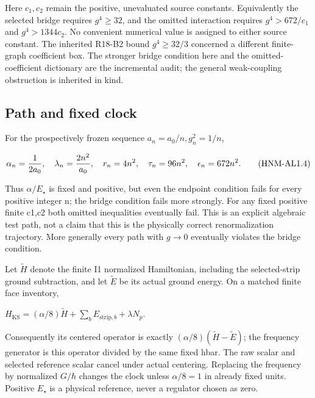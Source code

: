 Here \(c_1,c_2\) remain the positive, unevaluated source constants. Equivalently the selected bridge requires \(g^{4}\ge 32\), and the omitted interaction requires \(g^{4}>672/c_1\) and \(g^{4}>1344c_2\). No convenient numerical value is assigned to either source constant. The inherited R18-B2 bound \(g^{4}\ge 32/3\) concerned a different finite-graph coefficient box. The stronger bridge condition here and the omitted-coefficient dictionary are the incremental audit; the general weak-coupling obstruction is inherited in kind.

\hypertarget{r29-al1-path-and-fixed-clock}{%
\subsection{Path and fixed clock}\label{r29:al1:r29-al1-path-and-fixed-clock}}

For the prospectively frozen sequence \(a_n=a_0/n, g_n^{2}=1/n\),

\begin{equation}
\alpha_n={1\over2a_0},\quad\lambda_n={2n^2\over a_0},\quad
r_n=4n^2,\quad\tau_n=96n^2,\quad\epsilon_n=672n^2.
\tag{HNM-AL1.4}
\label{r29:al1:eq4}
\end{equation}

Thus \(\alpha/E_\star\) is fixed and positive, but even the endpoint condition fails for every positive integer n; the bridge condition fails more strongly. For any fixed positive finite c1,c2 both omitted inequalities eventually fail. This is an explicit algebraic test path, not a claim that this is the physically correct renormalization trajectory. More generally every path with \(g\to 0\) eventually violates the bridge condition.

Let \(\widetilde H\) denote the finite I1 normalized Hamiltonian, including the selected-strip ground subtraction, and let \(\widetilde E\) be its actual ground energy. On a matched finite face inventory,

\(H_{\mathrm{KS}} = (\alpha/8) \widetilde H + \sum_b E_{\mathrm{strip},b} + \lambda N_p\).

Consequently its centered operator is exactly \((\alpha/8)(\widetilde H-\widetilde E)\); the frequency generator is this operator divided by the same fixed hbar. The raw scalar and selected reference scalar cancel under actual centering. Replacing the frequency by normalized \(G/\hbar\) changes the clock unless \(\alpha/8=1\) in already fixed units. Positive \(E_\star\) is a physical reference, never a regulator chosen as zero.

